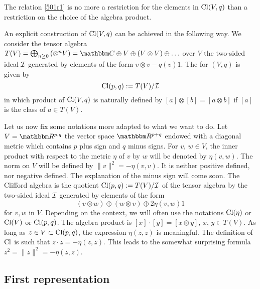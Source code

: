 \begin{remark}
The relation \eqref{501r1} is no more a restriction for the elements in $\operatorname{Cl}(V,q)$ than a restriction on the choice of the algebra product.
\end{remark}


An explicit construction of $\operatorname{Cl}(V,q)$ can be achieved in the following way. We consider the tensor algebra $T(V)=\bigoplus_{n\geq 0}\left(\otimes^nV\right)=\eC\oplus V\oplus(V\otimes V)\oplus\ldots$ over $V$ the two-sided ideal $\mathcal{I}$ generated by elements of the form $v\otimes v-q(v)1$. The   for $(V,q)$ is given by
\begin{equation}	\label{defI}
	\operatorname{Cl}(p,q):=T(V)/\mathcal{I}
\end{equation}
in which product of $\operatorname{Cl}(V,q)$ is naturally defined by $[a]\otimes[b]=[a\otimes b]$ if $[a]$ is the class of $a\in T(V)$.

Let us now fix some notations more adapted to what we want to do. Let $V=\eR^{p,q}$ the vector space $\eR^{p+q}$ endowed with a diagonal metric which contains $p$ plus sign and $q$ minus signs. For $v$, $w\in V$, the inner product with respect to the metric $\eta$ of $v$ by $w$ will be denoted by $\eta(v,w)$.  The norm on $V$ will be defined by $\|v\|^2=-\eta(v,v)$. It is neither positive defined, nor negative defined. The explanation of the minus sign will come soon. The Clifford algebra is the quotient $\operatorname{Cl}(p,q):=T(V)/\mathcal{I}$ of the tensor algebra by the two-sided ideal $\mathcal{I}$ generated by elements of the form
\[
	(v\otimes w)\oplus (w\otimes v)\oplus 2\eta(v,w)1
\]
 for $v,w$ in $V$. Depending on the context, we will often use the notations $\operatorname{Cl}(\eta)$ or $\operatorname{Cl}(V)$ or $\operatorname{Cl}(p,q)$. The algebra product is $[x]\cdot[y]=[x\otimes y]$, $x$, $y\in T(V)$.  As long as $z\in V\subset\operatorname{Cl}(p,q)$, the expression $\eta(z,z)$ is meaningful. The definition of $\operatorname{Cl}$ is such that $z\cdot z=-\eta(z,z)$. This leads to the somewhat surprising formula  $z^2=\|z\|^2=-\eta(z,z)$.

\subsection{First representation}

